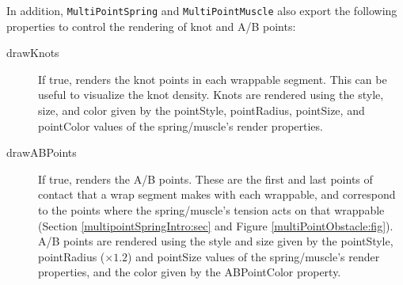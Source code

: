 In addition, {\tt MultiPointSpring} and {\tt MultiPointMuscle} also
export the following properties to control the rendering of knot and
A/B points:

\begin{description}

\item[drawKnots] If true, renders the knot points in each wrappable segment.
This can be useful to visualize the knot density. Knots are rendered
using the style, size, and color given by the {\sf pointStyle},
{\sf pointRadius}, {\sf pointSize}, and {\sf pointColor} values of the
spring/muscle's render properties.

\item[drawABPoints] If true, renders the A/B points. These
are the first and last points of contact that a wrap segment makes
with each wrappable, and correspond to the
points where the spring/muscle's tension acts on that wrappable
(Section \ref{multipointSpringIntro:sec} and
Figure \ref{multiPointObstacle:fig}).  A/B points are rendered using
the style and size given by the {\sf pointStyle}, {\sf pointRadius}
($\times 1.2$) and {\sf pointSize} values of the spring/muscle's render
properties, and the color given by the {\sf ABPointColor} property.

\end{description}

\ifdefined\maindoc
\else

\fi
